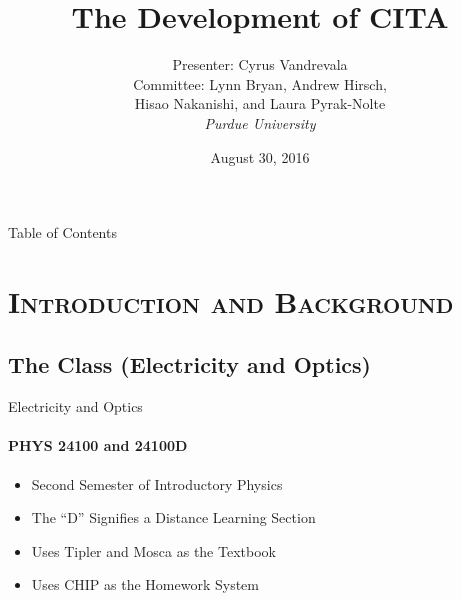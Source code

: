 \documentclass[xcolor=x11names,compress]{beamer}
\begin{document}
\beamertemplatenavigationsymbolsempty

\title{The Development of CITA}
\author{
    Presenter: Cyrus Vandrevala\\
    \vspace{3mm}
    Committee: Lynn Bryan, Andrew Hirsch,\\
    Hisao Nakanishi, and Laura Pyrak-Nolte\\
    \vspace{3mm}
    {\it Purdue University}\\
}
\date{August 30, 2016}


\begin{frame}
    \titlepage
\end{frame}


\begin{frame}{Table of Contents}
    \tableofcontents
\end{frame}


\section{\scshape Introduction and Background}

\subsection{The Class (Electricity and Optics)}

\begin{frame}{Electricity and Optics}
	\framesubtitle{PHYS 24100 and 24100D}
	\begin{itemize}
		\item Second Semester of Introductory Physics
		\vspace{2mm}
		\item The ``D'' Signifies a Distance Learning Section
		\vspace{2mm}
		\item Uses Tipler and Mosca as the Textbook
		\vspace{2mm}
		\item Uses CHIP as the Homework System
	\end{itemize}
\end{frame}
\end{document}
